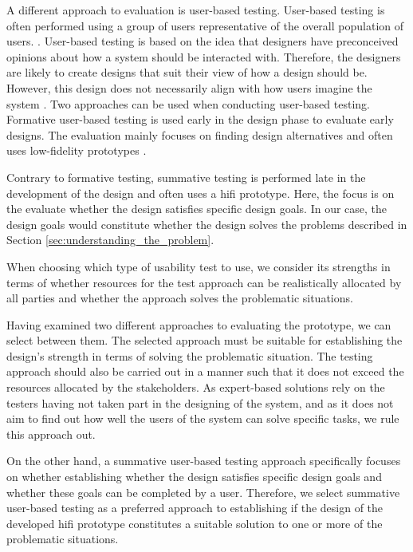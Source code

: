A different approach to evaluation is user-based testing.
User-based testing is often performed using a group of users representative of the overall population of users. \cite{researchmethodsinhumancomputerinteraction}.
User-based testing is based on the idea that designers have preconceived opinions about how a system should be interacted with. 
Therefore, the designers are likely to create designs that suit their view of how a design should be.
However, this design does not necessarily align with how users imagine the system \cite{user-centred-design,researchmethodsinhumancomputerinteraction}.
Two approaches can be used when conducting user-based testing. 
Formative user-based testing is used early in the design phase to evaluate early designs. 
The evaluation mainly focuses on finding design alternatives and often uses low-fidelity prototypes \cite{dumasAndFox_formative_usability_testing}.

Contrary to formative testing, summative testing is performed late in the development of the design and often uses a hifi prototype.
Here, the focus is on the evaluate whether the design satisfies specific design goals. \cite{dumasAndFox_formative_usability_testing}
In our case, the design goals would constitute whether the design solves the problems described in Section \ref{sec:understanding_the_problem}.

When choosing which type of usability test to use, we consider its strengths in terms of whether resources for the test approach can be realistically allocated by all parties and whether the approach solves the problematic situations.

Having examined two different approaches to evaluating the prototype, we can select between them.
The selected approach must be suitable for establishing the design's strength in terms of solving the problematic situation. 
The testing approach should also be carried out in a manner such that it does not exceed the resources allocated by the stakeholders. 
As expert-based solutions rely on the testers having not taken part in the designing of the system, and as it does not aim to find out how well the users of the system can solve specific tasks, we rule this approach out.

On the other hand, a summative user-based testing approach specifically focuses on whether establishing whether the design satisfies specific design goals and whether these goals can be completed by a user. 
Therefore, we select summative user-based testing as a preferred approach to establishing if the design of the developed hifi prototype constitutes a suitable solution to one or more of the problematic situations. 

